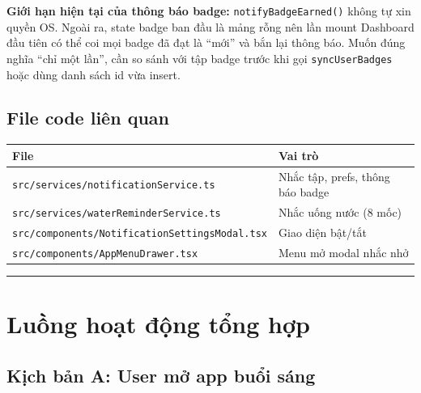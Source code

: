 \documentclass[12pt,a4paper]{article}
\newcounter{none}
\begin{document}
\textbf{Giới hạn hiện tại của thông báo badge:}
\texttt{notifyBadgeEarned()} không tự xin quyền OS. Ngoài ra, state
badge ban đầu là mảng rỗng nên lần mount Dashboard đầu tiên có thể coi
mọi badge đã đạt là ``mới'' và bắn lại thông báo. Muốn đúng nghĩa ``chỉ
một lần'', cần so sánh với tập badge trước khi gọi
\texttt{syncUserBadges} hoặc dùng danh sách id vừa insert.

\subsection{File code liên quan}\label{file-code-liuxean-quan-2}

{\def\LTcaptype{none} %
\begin{longtable}[]{@{}
  >{\raggedright\arraybackslash}p{}
  >{\raggedright\arraybackslash}p{}@{}}
\toprule\noalign{}
\begin{minipage}[b]{\linewidth}\raggedright
File
\end{minipage} & \begin{minipage}[b]{\linewidth}\raggedright
Vai trò
\end{minipage} \\
\midrule\noalign{}
\endhead
\bottomrule\noalign{}
\endlastfoot
\texttt{src/services/notificationService.ts} & Nhắc tập, prefs, thông
báo badge \\
\texttt{src/services/waterReminderService.ts} & Nhắc uống nước (8
mốc) \\
\texttt{src/components/NotificationSettingsModal.tsx} & Giao diện
bật/tắt \\
\texttt{src/components/AppMenuDrawer.tsx} & Menu mở modal nhắc nhở \\
\end{longtable}
}

\begin{center}\rule{0.5\linewidth}{0.5pt}\end{center}

\section{Luồng hoạt động tổng
hợp}\label{luux1ed3ng-houx1ea1t-ux111ux1ed9ng-tux1ed5ng-hux1ee3p}

\subsection{Kịch bản A: User mở app buổi
sáng}\label{kux1ecbch-bux1ea3n-a-user-mux1edf-app-buux1ed5i-suxe1ng}
\end{document}
